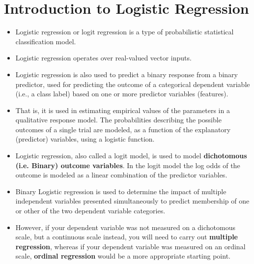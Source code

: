 \documentclass[a4paper,12pt]{article}
\begin{document}
\section*{Introduction to Logistic Regression}
\begin{itemize}
	\item Logistic regression or logit regression is a type of probabilistic statistical classification model.
\item Logistic regression  operates over real-valued vector inputs. 
	
%	
%	
	
	\item Logistic regression is also used to predict a binary response from a binary predictor, used for predicting the outcome of a categorical dependent variable (i.e., a class label) based on one or more predictor variables (features). 
	
	\item That is, it is used in estimating empirical values of the parameters in a qualitative response model. The probabilities describing the possible outcomes of a single trial are modeled, as a function of the explanatory (predictor) variables, using a logistic function. 
	
	\item Logistic regression, also called a logit model, is used to model \textbf{dichotomous (i.e. Binary) outcome variables}. In the logit model the log odds of the outcome is modeled as a linear combination of the predictor variables.
	
	\item 
	Binary Logistic regression is used to determine the impact of multiple independent variables
	presented simultaneously to predict membership of one or other of the two
	dependent variable categories.

	\item However, if your dependent variable was not measured on a dichotomous scale, but a continuous scale instead, you will need to carry out \textbf{multiple regression}, whereas if your dependent variable was measured on an ordinal scale, \textbf{ordinal regression} would be a more appropriate starting point.
\end{itemize}
\end{document}
